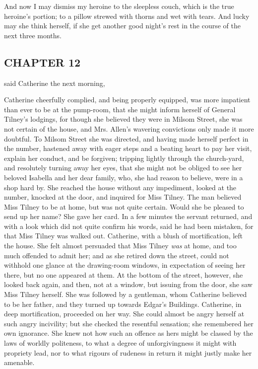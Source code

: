 And now I may dismiss my heroine to the sleepless couch, which is the true heroine's portion; to a pillow strewed with thorns and wet with tears. And lucky may she think herself, if she get another good night's rest in the course of the next three months.

\subsection[chapter-12]{\useURL[url14][][][]\from[url14]CHAPTER 12}

 said Catherine the next morning, 


Catherine cheerfully complied, and being properly equipped, was more impatient than ever to be at the pump-room, that she might inform herself of General Tilney's lodgings, for though she believed they were in Milsom Street, she was not certain of the house, and Mrs. Allen's wavering convictions only made it more doubtful. To Milsom Street she was directed, and having made herself perfect in the number, hastened away with eager steps and a beating heart to pay her visit, explain her conduct, and be forgiven; tripping lightly through the church-yard, and resolutely turning away her eyes, that she might not be obliged to see her beloved Isabella and her dear family, who, she had reason to believe, were in a shop hard by. She reached the house without any impediment, looked at the number, knocked at the door, and inquired for Miss Tilney. The man believed Miss Tilney to be at home, but was not quite certain. Would she be pleased to send up her name? She gave her card. In a few minutes the servant returned, and with a look which did not quite confirm his words, said he had been mistaken, for that Miss Tilney was walked out. Catherine, with a blush of mortification, left the house. She felt almost persuaded that Miss Tilney {\em was} at home, and too much offended to admit her; and as she retired down the street, could not withhold one glance at the drawing-room windows, in expectation of seeing her there, but no one appeared at them. At the bottom of the street, however, she looked back again, and then, not at a window, but issuing from the door, she saw Miss Tilney herself. She was followed by a gentleman, whom Catherine believed to be her father, and they turned up towards Edgar's Buildings. Catherine, in deep mortification, proceeded on her way. She could almost be angry herself at such angry incivility; but she checked the resentful sensation; she remembered her own ignorance. She knew not how such an offence as hers might be classed by the laws of worldly politeness, to what a degree of unforgivingness it might with propriety lead, nor to what rigours of rudeness in return it might justly make her amenable.

